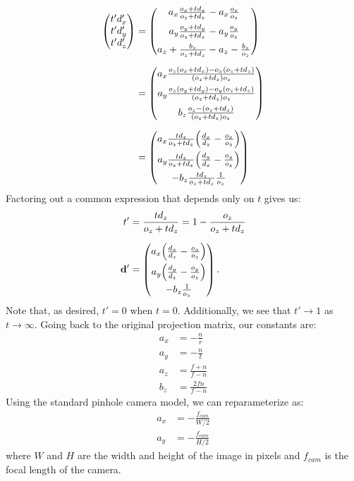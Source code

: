 \documentclass[runningheads]{llncs}
\let\originalleft\left
\let\originalright\right
\renewcommand{\left}{\mathopen{}\mathclose\bgroup\originalleft}
\renewcommand{\right}{\aftergroup\egroup\originalright}
\begin{document}
\begin{align}
    \begin{pmatrix}
        t' d_x' \\
        t' d_y' \\
        t' d_z' 
    \end{pmatrix}
    &=
    \begin{pmatrix}
        a_x \frac{o_x + t d_x}{o_z + t d_z} - a_x \frac{o_x}{o_z} \\[6pt]
        a_y \frac{o_y + t d_y}{o_z + t d_z} - a_y \frac{o_y}{o_z} \\[6pt]
        a_z + \frac{b_z}{o_z + t d_z} - a_z - \frac{b_z}{o_z}
    \end{pmatrix} \\[6pt]
    &=
    \begin{pmatrix}
        a_x \frac{o_z(o_x + t d_x) - o_x(o_z + t d_z)}{(o_z + t d_z)o_z} \\[6pt]
        a_y \frac{o_z(o_y + t d_y) - o_y(o_z + t d_z)}{(o_z + t d_z)o_z} \\[6pt]
        b_z\frac{o_z - (o_z + t d_z)}{(o_z + t d_z)o_z}
    \end{pmatrix} \\[6pt]
    &= 
    \begin{pmatrix}
        a_x \frac{t d_z}{o_z + t d_z} \left(\frac{d_x}{d_z} - \frac{o_x}{o_z}\right) \\[6pt]
        a_y \frac{t d_z}{o_z + t d_z} \left(\frac{d_y}{d_z} - \frac{o_y}{o_z}\right) \\[6pt]
        -b_z \frac{t d_z}{o_z + t d_z} \frac{1}{o_z}
    \end{pmatrix} 
\end{align}
Factoring out a common expression that depends only on $t$ gives us:
\begin{align}
    t' &= \frac{t d_z}{o_z + t d_z} = 1 - \frac{o_z}{o_z + t d_z} \\[6pt]
    \mathbf d' &= 
    \begin{pmatrix}
        a_x \left(\frac{d_x}{d_z} - \frac{o_x}{o_z}\right) \\[6pt]
        a_y \left(\frac{d_y}{d_z} - \frac{o_y}{o_z}\right) \\[6pt]
        -b_z \frac{1}{o_z}
    \end{pmatrix} \,. 
\end{align}
Note that, as desired, $t'=0$ when $t=0$. Additionally, we see that $t' \to 1$ as $t \to \infty$. Going back to the original projection matrix, our constants are:
\begin{align}
    a_x &= -\frac{n}{r} \\
    a_y &= -\frac{n}{t} \\
    a_z &= \frac{f+n}{f-n} \\
    b_z &= \frac{2fn}{f-n} 
\end{align}
Using the standard pinhole camera model, we can reparameterize as:
\begin{align}
    a_x &= -\frac{f_{cam}}{W/2} \\
    a_y &= -\frac{f_{cam}}{H/2} 
\end{align}
where $W$ and $H$ are the width and height of the image in pixels and $f_{cam}$ is the focal length of the camera. 
\end{document}
